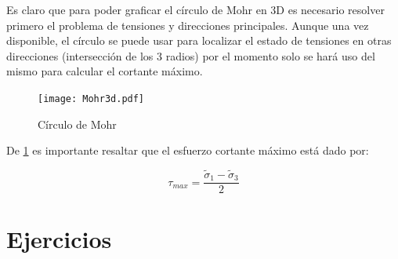 \documentclass[../notas medios.tex]{subfiles}
\begin{document}
Es claro que para poder graficar el círculo de Mohr en 3D es necesario resolver primero el problema de tensiones y direcciones principales. Aunque una vez disponible, el círculo se puede usar para localizar el estado de tensiones en otras direcciones (intersección de los 3 radios) por el momento solo se hará uso del mismo para calcular el cortante máximo.


\begin{figure}[H]
\centering
	\texttt{[image: Mohr3d.pdf]}
	\caption{Círculo de Mohr}
	\label{Mohr3D}
\end{figure}

De \cref{Mohr3D} es importante resaltar que el esfuerzo cortante máximo está dado por:

\[\tau_{max} =\frac{{\tilde \sigma }_1 - {\tilde \sigma }_3}{2} \]

%
%

\newpage

\section{Ejercicios}
\end{document}
